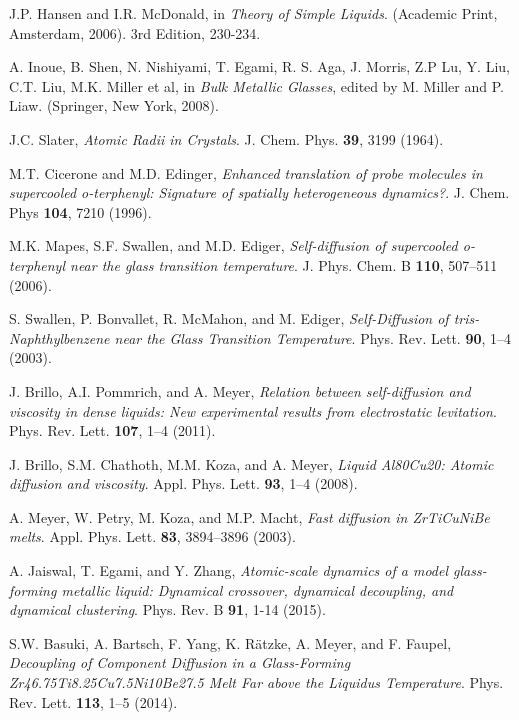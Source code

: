 \documentclass[aps,prl,preprint,showpacs,amsmath,floatfix,superscriptaddress]{revtex4}
\begin{document}
\begin{thebibliography}{}
J.P. Hansen and I.R. McDonald, in \textit{Theory of Simple Liquids}. (Academic Print, Amsterdam, 2006). 3rd Edition, 230-234.

A. Inoue, B. Shen, N. Nishiyami, T. Egami, R. S. Aga, J. Morris, Z.P Lu, Y. Liu, C.T. Liu, M.K. Miller et al, in \textit{Bulk Metallic Glasses}, edited by M. Miller and P. Liaw. (Springer, New York, 2008).

J.C. Slater, \textit{Atomic Radii in Crystals}. J. Chem. Phys. \textbf{39}, 3199 (1964).

M.T. Cicerone and M.D. Edinger, \textit{Enhanced translation of probe molecules in supercooled o-terphenyl: Signature of spatially heterogeneous dynamics?}. J. Chem. Phys \textbf{104}, 7210 (1996).

M.K. Mapes, S.F. Swallen, and M.D. Ediger, \textit{Self-diffusion of supercooled o-terphenyl near the glass transition temperature}. J. Phys. Chem. B \textbf{110}, 507–511 (2006).

S. Swallen, P. Bonvallet, R. McMahon, and M. Ediger, \textit{Self-Diffusion of tris-Naphthylbenzene near the Glass Transition Temperature}. Phys. Rev. Lett. \textbf{90}, 1–4 (2003).

J. Brillo, A.I. Pommrich, and A. Meyer, \textit{Relation between self-diffusion and viscosity in dense liquids: New experimental results from electrostatic levitation}. Phys. Rev. Lett. \textbf{107}, 1–4 (2011).

J. Brillo, S.M. Chathoth, M.M. Koza, and A. Meyer, \textit{Liquid Al80Cu20: Atomic diffusion and viscosity}. Appl. Phys. Lett. \textbf{93}, 1–4 (2008).

A. Meyer, W. Petry, M. Koza, and M.P. Macht, \textit{Fast diffusion in ZrTiCuNiBe melts}. Appl. Phys. Lett. \textbf{83}, 3894–3896 (2003).

A. Jaiswal, T. Egami, and Y. Zhang, \textit{Atomic-scale dynamics of a model glass-forming metallic liquid: Dynamical crossover, dynamical decoupling, and dynamical clustering}. Phys. Rev. B \textbf{91}, 1-14 (2015).

S.W. Basuki, A. Bartsch, F. Yang, K. Rätzke, A. Meyer, and F. Faupel, \textit{Decoupling of Component Diffusion in a Glass-Forming Zr46.75Ti8.25Cu7.5Ni10Be27.5 Melt Far above the Liquidus Temperature}. Phys. Rev. Lett. \textbf{113}, 1–5 (2014).


\end{thebibliography}
\end{document}
